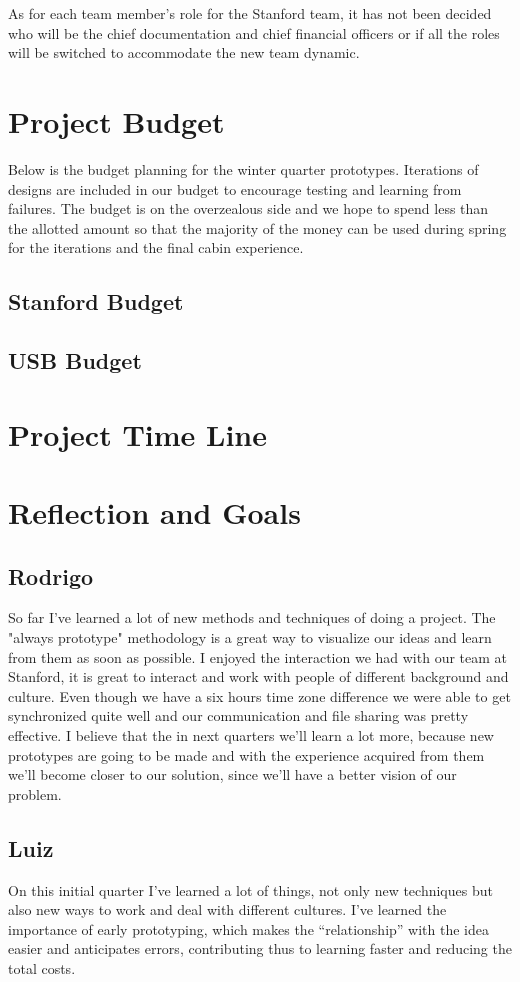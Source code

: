 As for each team member’s role for the Stanford team, it has not been decided who will be the chief documentation and chief financial officers or if all the roles will be switched to accommodate the new team dynamic. 

\section{Project Budget}
Below is the budget planning for the winter quarter prototypes.  Iterations of designs are included in our budget to encourage testing and learning from failures. The budget is on the overzealous side and we hope to spend less than the allotted amount so that the majority of the money can be used during spring for the iterations and the final cabin experience.
\subsection{Stanford Budget}
\subsection{USB Budget}
 

\section{Project Time Line}
\section{Reflection and Goals}
\subsection{Rodrigo}
So far I’ve learned a lot of new methods and techniques of doing a project. The "always prototype" methodology is a great way to visualize our ideas and learn from them as soon as possible.
I enjoyed the interaction we had with our team at Stanford, it is great to interact and work with people of different background and culture. Even though we have a six hours time zone difference we were able to get synchronized quite well and our communication and file sharing was pretty effective.
I believe that the in next quarters we'll learn a lot more, because new prototypes are going to be made and with the experience acquired from them we'll become closer to our solution, since we'll have a better vision of our problem.

\subsection{Luiz}
On this initial quarter I’ve learned a lot of things, not only new techniques but also new ways to work and deal with different cultures. I’ve learned the importance of early prototyping, which makes the “relationship” with the idea easier and anticipates errors, contributing thus to learning faster and reducing the total costs.

